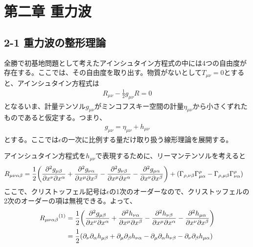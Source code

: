 \documentclass[autodetect-engine,dvi=dvipdfmx,ja=standard, 10pt, a4paper]{bxjsarticle}
\begin{document}
\section*{第二章 重力波}
\subsection*{2-1 重力波の整形理論}
全勝で初基地問題として考えたアインシュタイン方程式の中には4つの自由度が存在する。ここでは、その自由度を取り出す。物質がないとして$T_{\mu\nu}=0$とすると、アインシュタイン方程式は
\begin{align}
	R_{\mu\nu} - \frac{1}{2}g_{\mu\nu}R = 0
\end{align}
となるいま、計量テンソル$g_{\mu\nu}$がミンコフスキー空間の計量$\eta_{\mu\nu}$から小さくずれたものであると仮定する。つまり、
\begin{align}
	g_{\mu\nu} = \eta_{\mu\nu} + h_{\mu\nu}
\end{align}
とする。ここでは$\epsilon$の一次に比例する量だけ取り扱う線形理論を展開する。

アインシュタイン方程式を$h_{\mu\nu}$で表現するために、リーマンテンソルを考えると
\begin{align}
	R_{\mu\nu\alpha\beta} &= \frac{1}{2}\qty(\pdv{^2 g_{\mu\beta}}{x^\nu \partial x^\alpha} + \pdv{^2 g_{\nu\alpha}}{x^\mu \partial x^\beta}  - \pdv{^2 g_{\nu\beta}}{x^\mu \partial x^\alpha}- \pdv{^2 g_{\mu\alpha}}{x^\nu \partial x^\beta}) + (\Gamma_{\rho,\nu\beta}\Gamma^\rho_{\mu\alpha} - \Gamma_{\rho,\mu\beta}\Gamma^\rho_{\nu\alpha})
\end{align}
ここで、クリストッフェル記号は$\epsilon$の1次のオーダーなので、クリストッフェルの2次のオーダーの項は無視できる。よって、
\begin{align}
	R_{\mu\nu\alpha\beta} {}^{(1)}&= \frac{1}{2}\qty(\pdv{^2 g_{\mu\beta}}{x^\nu \partial x^\alpha} + \pdv{^2 h_{\nu\alpha}}{x^\mu \partial x^\beta}  - \pdv{^2 h_{\nu\beta}}{x^\mu \partial x^\alpha}- \pdv{^2 h_{\mu\alpha}}{x^\nu \partial x^\beta})\nonumber\\
	&= \frac{1}{2}\qty(\partial_\nu \partial_\alpha h_{\mu\beta} + \partial_\mu \partial_\beta h_{\nu\alpha} - \partial_\mu \partial_\alpha h_{\nu\beta} - \partial_\nu \partial_\beta h_{\mu\alpha})
\end{align}
\end{document}
